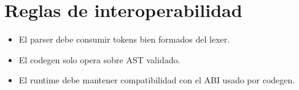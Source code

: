 \documentclass[11pt,a4paper]{article}
\begin{document}
\section{Reglas de interoperabilidad}
\begin{itemize}
    \item El parser debe consumir tokens bien formados del lexer.
    \item El codegen solo opera sobre AST validado.
    \item El runtime debe mantener compatibilidad con el ABI usado por codegen.
\end{itemize}
\end{document}
